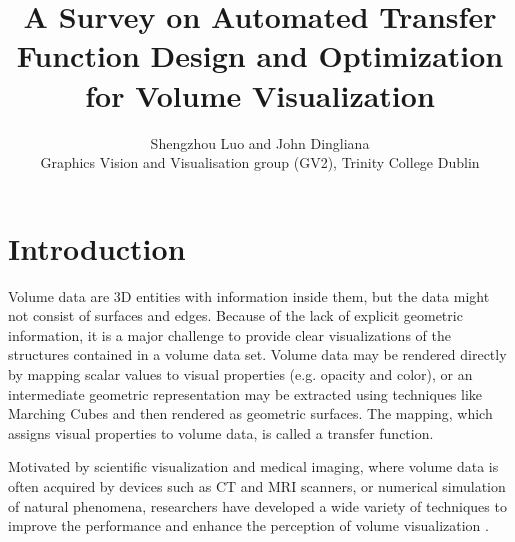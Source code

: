 \documentclass{egpubl}
\title%
{
A Survey on Automated Transfer Function Design and Optimization for Volume Visualization}
\author[S. Luo \& J. Dingliana]
{Shengzhou Luo
and
John Dingliana
\\
Graphics Vision and Visualisation group (GV2), Trinity College Dublin
}
\begin{document}
	
	
\maketitle

%	
%	

\section{Introduction}
Volume data are 3D entities with information inside them, but the data might not consist of surfaces and edges.
Because of the lack of explicit geometric information, %
it is a major challenge to provide clear visualizations of the structures contained in a volume data set.
Volume data may be rendered directly by mapping scalar values to visual properties (e.g. opacity and color), or an intermediate geometric representation may be extracted using techniques like Marching Cubes \cite{lorensen_marching_1987} and then rendered as geometric surfaces. The mapping, which assigns visual properties to volume data, is called a transfer function.

Motivated by scientific visualization and medical imaging, where volume data is often acquired by devices such as CT and MRI scanners, or numerical simulation of natural phenomena, researchers have developed a wide variety of techniques to improve the performance and enhance the perception of volume visualization \cite{corcoran_enhancing_2013}.
\end{document}

